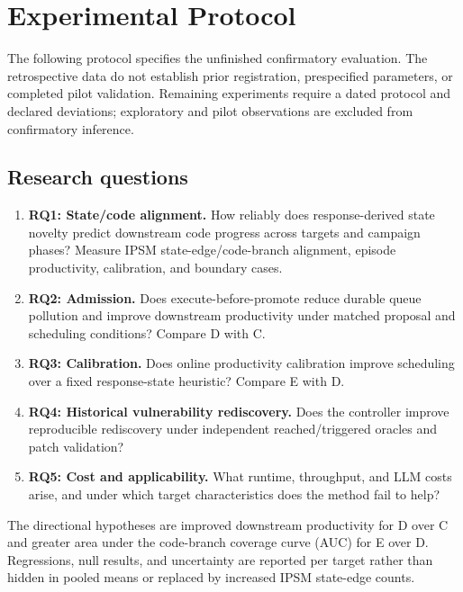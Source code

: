 \documentclass[final,5p,times,number]{elsarticle}
\begin{document}
\section{Experimental Protocol}
\label{sec:protocol}
The following protocol specifies the unfinished confirmatory evaluation. The retrospective data do not establish prior registration, prespecified parameters, or completed pilot validation. Remaining experiments require a dated protocol and declared deviations; exploratory and pilot observations are excluded from confirmatory inference.

\subsection{Research questions}
\begin{enumerate}
\item \textbf{RQ1: State/code alignment.} How reliably does response-derived state novelty predict downstream code progress across targets and campaign phases? Measure IPSM state-edge/code-branch alignment, episode productivity, calibration, and boundary cases.
\item \textbf{RQ2: Admission.} Does execute-before-promote reduce durable queue pollution and improve downstream productivity under matched proposal and scheduling conditions? Compare D with C.
\item \textbf{RQ3: Calibration.} Does online productivity calibration improve scheduling over a fixed response-state heuristic? Compare E with D.
\item \textbf{RQ4: Historical vulnerability rediscovery.} Does the controller improve reproducible rediscovery under independent reached/triggered oracles and patch validation?
\item \textbf{RQ5: Cost and applicability.} What runtime, throughput, and LLM costs arise, and under which target characteristics does the method fail to help?
\end{enumerate}
The directional hypotheses are improved downstream productivity for D over C and greater area under the code-branch coverage curve (AUC) for E over D. Regressions, null results, and uncertainty are reported per target rather than hidden in pooled means or replaced by increased IPSM state-edge counts.
\end{document}
